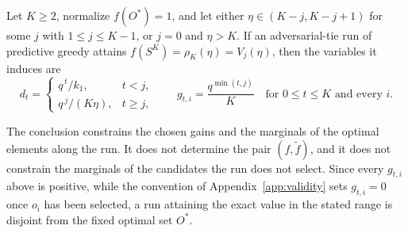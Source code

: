 \begin{proposition}\label{prop:rigidity}
Let $K\ge2$, normalize $f(O^{\ast})=1$, and let either
$\eta\in(K-j,K-j+1)$ for some $j$ with $1\le j\le K-1$, or $j=0$ and
$\eta>K$.  If an adversarial-tie run of predictive greedy attains
$f(S^{K})=\rho_K(\eta)=V_j(\eta)$, then the variables it induces are
\[
  d_t=\begin{cases}q^{\,t}/k_1, & t<j,\\[2pt]
                   q^{\,j}/(K\eta), & t\ge j,\end{cases}
  \qquad
  g_{t,i}=\frac{q^{\min(t,j)}}{K}
  \quad\text{for }0\le t\le K\text{ and every }i .
\]
\end{proposition}
The conclusion constrains the chosen gains and the marginals of the optimal
elements along the run.  It does not determine the pair $(f,\tilde f)$, and it
does not constrain the marginals of the candidates the run does not select.
Since every $g_{t,i}$ above is positive, while the convention of
Appendix~\ref{app:validity} sets $g_{t,i}=0$ once $o_i$ has been selected, a
run attaining the exact value in the stated range is disjoint from the fixed
optimal set $O^{\ast}$.

